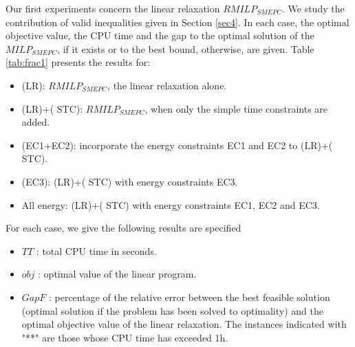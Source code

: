 \documentclass[11pt]{article}
\theoremstyle{plain}%
\theoremstyle{definition} \newtheorem{lem}{Lemma}[section]
\theoremstyle{definition} \newtheorem{claim}{Claim}[lem]
\theoremstyle{definition} \newtheorem{theorem}{Theorem}[section]
\theoremstyle{definition} \newtheorem{exo}{Exercice n$^\circ$}
\theoremstyle{definition} \newtheorem{quest}{}[exo]
\theoremstyle{definition} \newtheorem{sousquest}{}[quest]
\theoremstyle{remark}
\theoremstyle{definition}
\begin{document}
Our first experiments concern the linear relaxation $RMILP_{SMEPC}$. We study the contribution of   valid inequalities given in Section \ref{sec4}. In each case, the optimal objective value, the CPU time and the gap to the optimal solution of the $MILP_{SMEPC}$, if it exists or to the best bound, otherwise, are given.  Table \ref{tab:frac1} presents the results for:
\begin{itemize}
\item (LR): $RMILP_{SMEPC}$, the linear relaxation alone. 
\item  (LR)+( STC): $RMILP_{SMEPC}$, when only the simple time constraints are added.
 \item  (EC1+EC2):  incorporate the energy constraints EC1 and EC2 to  (LR)+( STC). 
 \item  (EC3): (LR)+( STC) with energy constraints EC3. 
\item  All energy: (LR)+( STC) with energy constraints EC1, EC2 and EC3.
 \end{itemize}
 For each case, we give the following results are specified
 \begin{itemize}
\item $TT$ : total CPU time in seconds.
\item $obj$ : optimal value of the linear program.
\item $GapF$ : percentage of the relative error between the best feasible solution (optimal solution if the problem has been solved to optimality) and the optimal objective value of the linear relaxation. The instances indicated with "**" are those whose CPU time has exceeded 1h.
\end{itemize}
\end{document}
